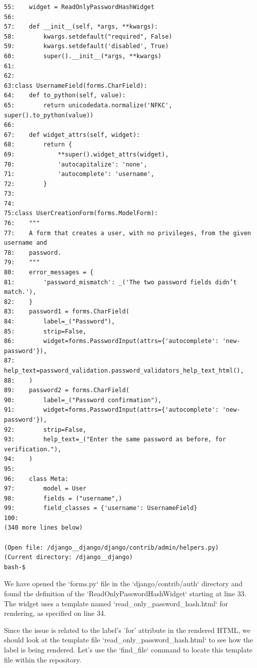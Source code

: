 {\begin{observationbox}
\begin{Verbatim}[breaklines=true, breakanywhere=true]
55:    widget = ReadOnlyPasswordHashWidget
56:
57:    def __init__(self, *args, **kwargs):
58:        kwargs.setdefault("required", False)
59:        kwargs.setdefault('disabled', True)
60:        super().__init__(*args, **kwargs)
61:
62:
63:class UsernameField(forms.CharField):
64:    def to_python(self, value):
65:        return unicodedata.normalize('NFKC', super().to_python(value))
66:
67:    def widget_attrs(self, widget):
68:        return {
69:            **super().widget_attrs(widget),
70:            'autocapitalize': 'none',
71:            'autocomplete': 'username',
72:        }
73:
74:
75:class UserCreationForm(forms.ModelForm):
76:    """
77:    A form that creates a user, with no privileges, from the given username and
78:    password.
79:    """
80:    error_messages = {
81:        'password_mismatch': _('The two password fields didn’t match.'),
82:    }
83:    password1 = forms.CharField(
84:        label=_("Password"),
85:        strip=False,
86:        widget=forms.PasswordInput(attrs={'autocomplete': 'new-password'}),
87:        help_text=password_validation.password_validators_help_text_html(),
88:    )
89:    password2 = forms.CharField(
90:        label=_("Password confirmation"),
91:        widget=forms.PasswordInput(attrs={'autocomplete': 'new-password'}),
92:        strip=False,
93:        help_text=_("Enter the same password as before, for verification."),
94:    )
95:
96:    class Meta:
97:        model = User
98:        fields = ("username",)
99:        field_classes = {'username': UsernameField}
100:
(340 more lines below)

(Open file: /django__django/django/contrib/admin/helpers.py)
(Current directory: /django__django)
bash-$
\end{Verbatim}
\end{observationbox}
\begin{agentbox}
We have opened the `forms.py` file in the `django/contrib/auth` directory and found the definition of the `ReadOnlyPasswordHashWidget` starting at line 33. The widget uses a template named `read\_only\_password\_hash.html` for rendering, as specified on line 34.



Since the issue is related to the label's 'for' attribute in the rendered HTML, we should look at the template file `read\_only\_password\_hash.html` to see how the label is being rendered. Let's use the `find\_file` command to locate this template file within the repository.




\end{agentbox}}
